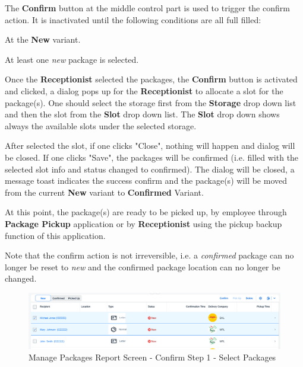 The \textbf{Confirm} button at the middle control part is used to trigger the confirm action. It is inactivated until the following conditions are all full filled:

\begin{compactenum}
    \item At the \textbf{New} variant.
    \item At least one \textit{new} package is selected.
\end{compactenum}

Once the \textbf{Receptionist} selected the packages, the \textbf{Confirm} button is activated and clicked, a dialog pops up for the \textbf{Receptionist} to allocate a slot for the package(s). One should select the storage first from the \textbf{Storage} drop down list and then the slot from the \textbf{Slot} drop down list. The \textbf{Slot} drop down shows always the available slots under the selected storage.

After selected the slot, if one clicks "Close", nothing will happen and dialog will be closed. If one clicks "Save", the packages will be confirmed (i.e. filled with the selected slot info and status changed to confirmed). The dialog will be closed, a message toast indicates the success confirm and the package(s) will be moved from the current \textbf{New} variant to \textbf{Confirmed} Variant.

At this point, the package(s) are ready to be picked up, by employee through \textbf{Package Pickup} application or by \textbf{Receptionist} using the pickup backup function of this application.

Note that the confirm action is not irreversible, i.e. a \textit{confirmed} package can no longer be reset to \textit{new} and the confirmed package location can no longer be changed.

\begin{figure}[H]
	\centering
	\includegraphics[width=1\linewidth]{images/user_doc/managePack/ReportScreen/browse/confirmActivated.png}
	\caption{Manage Packages Report Screen - Confirm Step 1 - Select Packages}
	\label{fig:MPReportConfirmBtn}
\end{figure}

